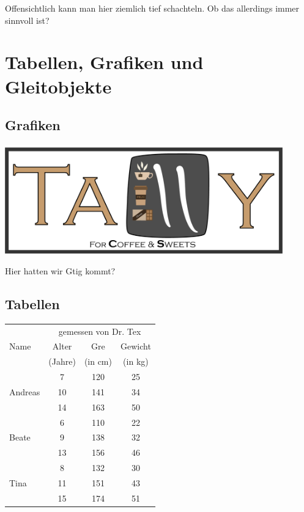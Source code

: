 \documentclass[11pt,a4paper]{article} %
\begin{document}
Offensichtlich kann man hier ziemlich tief schachteln. Ob das allerdings immer sinnvoll ist?



\section{Tabellen, Grafiken und Gleitobjekte}
\label{TabellenGrafikenFloats}


\subsection{Grafiken}
\label{Grafiken}


\begin{center}
\includegraphics[width=12cm]{TallyLogo.png}
\end{center}

Hier hatten wir Gtig kommt?

\subsection{Tabellen}
\label{Tabellen}



\begin{center}
\begin{tabular}{|l||c|c|c|}
\hline
           & \multicolumn{3}{|c|}{gemessen von Dr. Tex} \\
\cline{2-4}
Name       &  Alter    & Gre   & Gewicht \\
           &  (Jahre)  & (in cm) & (in kg) \\
\hline
\hline
           &   7       &  120    &  25     \\
\cline{2-4}
Andreas    &   10      &  141    &  34     \\
\cline{2-4}
           &   14      &  163    &  50     \\
\hline
           &   6       &  110    &  22     \\
\cline{2-4}
Beate      &   9       &  138    &  32     \\
\cline{2-4}
           &   13      &  156    &  46     \\
\hline
           &   8       &  132    &  30     \\
\cline{2-4}
Tina       &   11      &  151    &  43     \\
\cline{2-4}
           &   15      &  174    &  51     \\
\hline
\end{tabular}
\end{center}
\end{document}

